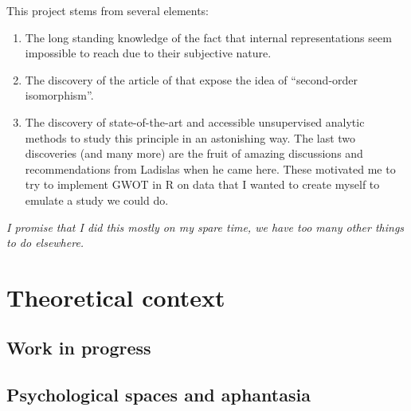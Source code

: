 \documentclass[
  authoryear]{elsarticle}
\renewcommand*\contentsname{Table of contents}
\newcommand\contentsname{Table of contents}
\begin{document}
\renewcommand*\contentsname{Table of contents}
{
\hypersetup{linkcolor=}
\setcounter{tocdepth}{2}
\tableofcontents
}
\begin{tcolorbox}[enhanced jigsaw, bottomrule=.15mm, toptitle=1mm, opacitybacktitle=0.6, left=2mm, rightrule=.15mm, opacityback=0, colbacktitle=quarto-callout-tip-color!10!white, breakable, titlerule=0mm, colback=white, bottomtitle=1mm, coltitle=black, leftrule=.75mm, title=\textcolor{quarto-callout-tip-color}{\faLightbulb}\hspace{0.5em}{Project inception}, arc=.35mm, colframe=quarto-callout-tip-color-frame, toprule=.15mm]

This project stems from several elements:

\begin{enumerate}
\def\labelenumi{\arabic{enumi}.}
\item
  The long standing knowledge of the fact that internal representations
  seem impossible to reach due to their subjective nature.
\item
  The discovery of the article of
  \citet{shepardSecondorderIsomorphismInternal1970} that expose the idea
  of ``second-order isomorphism''.
\item
  The discovery of state-of-the-art and accessible unsupervised analytic
  methods to study this principle in an astonishing way. The last two
  discoveries (and many more) are the fruit of amazing discussions and
  recommendations from Ladislas when he came here. These motivated me to
  try to implement GWOT in R on data that I wanted to create myself to
  emulate a study we could do.
\end{enumerate}

\emph{I promise that I did this mostly on my spare time, we have too
many other things to do elsewhere.}

\end{tcolorbox}

\section{Theoretical context}\label{theoretical-context}

\subsection{Work in progress}\label{work-in-progress}

\subsection{Psychological spaces and
aphantasia}\label{psychological-spaces-and-aphantasia}
\end{document}
